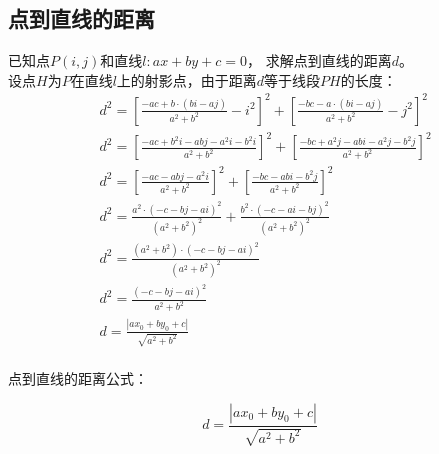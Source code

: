 \documentclass[UTF8]{ctexart}
\begin{document}
\newpage

\subsection{点到直线的距离}
    已知点$P(i,j)$和直线$l:ax+by+c=0$，
    求解点到直线的距离$d$。\\[3mm]
    设点$H$为$P$在直线$l$上的射影点，由于距离$d$等于线段$PH$的长度：\vspace{15pt}
    \setcounter{equation}{0}
    \begin{align}
        &d^2=\left[\frac{-ac+b\cdot(bi-aj)}{a^2+b^2}-i^2\right]^2+\left[\frac{-bc-a\cdot(bi-aj)}{a^2+b^2}-j^2\right]^2\\[7mm]
        &d^2=\left[\frac{-ac+b^2i-abj-a^2i-b^2i}{a^2+b^2}\right]^2+\left[\frac{-bc+a^2j-abi-a^2j-b^2j}{a^2+b^2}\right]^2\\[7mm]
        &d^2=\left[\frac{-ac-abj-a^2i}{a^2+b^2}\right]^2+\left[\frac{-bc-abi-b^2j}{a^2+b^2}\right]^2\\[7mm]
        &d^2=\frac{a^2\cdot\left(-c-bj-ai\right)^2}{\left(a^2+b^2\right)^2}+\frac{b^2\cdot\left(-c-ai-bj\right)^2}{\left(a^2+b^2\right)^2}\\[7mm]
        &d^2=\frac{(a^2+b^2)\cdot\left(-c-bj-ai\right)^2}{\left(a^2+b^2\right)^2}\\[7mm]
        &d^2=\frac{\left(-c-bj-ai\right)^2}{a^2+b^2}\\[8mm]
        &d=\frac{\left|ax_{0}+by_{0}+c\right|}{\sqrt{{a}^{2}+{b}^{2}}}
    \end{align}\\[1mm]
    点到直线的距离公式：
    \begin{large}
        \begin{equation*}
            d=\frac{\left|ax_{0}+by_{0}+c\right|}{\sqrt{{a}^{2}+{b}^{2}}}
        \end{equation*}
    \end{large}\\

\newpage
\end{document}
